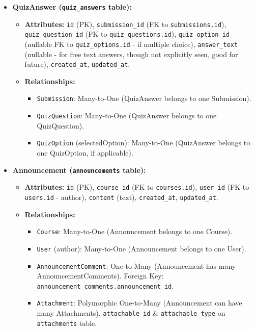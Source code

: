 \documentclass[12pt,a4paper]{article}
\begin{document}
\begin{itemize}
\begin{itemize}
\begin{itemize}
        \end{itemize}
    \end{itemize}
    \item \textbf{QuizAnswer (\texttt{quiz\_answers} table):}
    \begin{itemize}
        \item \textbf{Attributes:} \texttt{id} (PK), \texttt{submission\_id} (FK to \texttt{submissions.id}), \texttt{quiz\_question\_id} (FK to \texttt{quiz\_questions.id}), \texttt{quiz\_option\_id} (nullable FK to \texttt{quiz\_options.id} - if multiple choice), \texttt{answer\_text} (nullable - for free text answers, though not explicitly seen, good for future), \texttt{created\_at}, \texttt{updated\_at}.
        \item \textbf{Relationships:}
        \begin{itemize}
            \item \texttt{Submission}: Many-to-One (QuizAnswer belongs to one Submission).
            \item \texttt{QuizQuestion}: Many-to-One (QuizAnswer belongs to one QuizQuestion).
            \item \texttt{QuizOption} (selectedOption): Many-to-One (QuizAnswer belongs to one QuizOption, if applicable).
        \end{itemize}
    \end{itemize}
    \item \textbf{Announcement (\texttt{announcements} table):}
    \begin{itemize}
        \item \textbf{Attributes:} \texttt{id} (PK), \texttt{course\_id} (FK to \texttt{courses.id}), \texttt{user\_id} (FK to \texttt{users.id} - author), \texttt{content} (text), \texttt{created\_at}, \texttt{updated\_at}.
        \item \textbf{Relationships:}
        \begin{itemize}
            \item \texttt{Course}: Many-to-One (Announcement belongs to one Course).
            \item \texttt{User} (author): Many-to-One (Announcement belongs to one User).
            \item \texttt{AnnouncementComment}: One-to-Many (Announcement has many AnnouncementComments). Foreign Key: \texttt{announcement\_comments.announcement\_id}.
            \item \texttt{Attachment}: Polymorphic One-to-Many (Announcement can have many Attachments). \texttt{attachable\_id} \& \texttt{attachable\_type} on \texttt{attachments} table.

\end{itemize}
\end{itemize}
\end{itemize}
\end{document}
